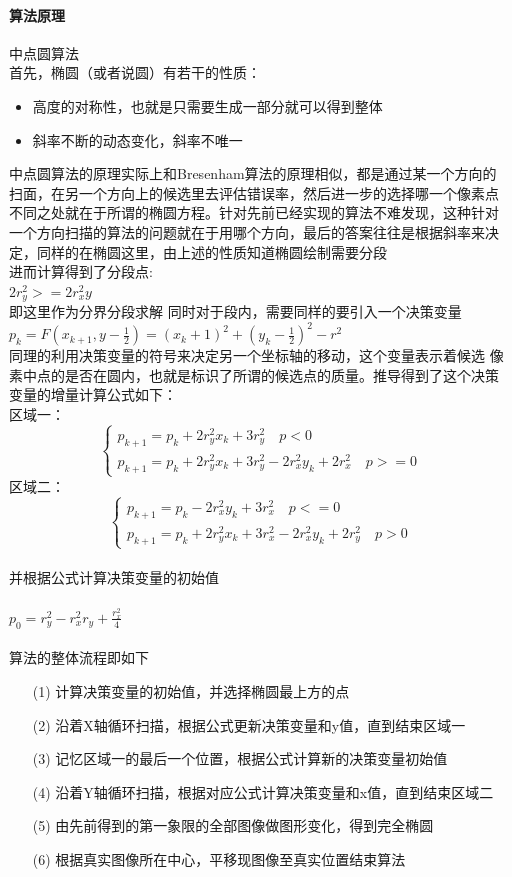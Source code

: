 \documentclass[a4paper,UTF8]{article}
\theoremstyle{definition}
\begin{document}
\paragraph{算法原理}
中点圆算法\\
首先，椭圆（或者说圆）有若干的性质：
\begin{itemize}
    \item 高度的对称性，也就是只需要生成一部分就可以得到整体
    \item 斜率不断的动态变化，斜率不唯一
\end{itemize}
中点圆算法的原理实际上和Bresenham算法的原理相似，都是通过某一个方向的
扫面，在另一个方向上的候选里去评估错误率，然后进一步的选择哪一个像素点
不同之处就在于所谓的椭圆方程。针对先前已经实现的算法不难发现，这种针对
一个方向扫描的算法的问题就在于用哪个方向，最后的答案往往是根据斜率来决
定，同样的在椭圆这里，由上述的性质知道椭圆绘制需要分段\\
进而计算得到了分段点:\\
\indent $2r_y^2>=2r_x^2y$\\
即这里作为分界分段求解
同时对于段内，需要同样的要引入一个决策变量\\
$p_k=F(x_{k+1},y-\frac{1}{2})=(x_k+1)^2+(y_k-\frac{1}{2})^2-r^2$\\
同理的利用决策变量的符号来决定另一个坐标轴的移动，这个变量表示着候选
像素中点的是否在圆内，也就是标识了所谓的候选点的质量。推导得到了这个决策
变量的增量计算公式如下：\\
区域一：
$$
\begin{cases}
    p_{k+1}=p_k +2r_y^2x_k+3r_y^2 \quad \text{$p<0$}\\
    p_{k+1}=p_k +2r_y^2x_k+3r_y^2-2r_x^2y_k+2r_x^2 \quad \text{$p>=0$}
\end{cases}
$$
区域二：
$$
\begin{cases}
    p_{k+1}=p_k -2r_x^2y_k+3r_x^2 \quad \text{$p<=0$}\\
    p_{k+1}=p_k +2r_y^2x_k+3r_x^2-2r_x^2y_k+2r_y^2 \quad \text{$p>0$}
\end{cases}
$$\\
并根据公式计算决策变量的初始值\\\\
$p_0=r_y^2-r_x^2r_y+\frac{r_x^2}{4}$\\\\
算法的整体流程即如下
\begin{itemize}
    \item [(1)] 
    计算决策变量的初始值，并选择椭圆最上方的点
    \item [(2)]
    沿着X轴循环扫描，根据公式更新决策变量和y值，直到结束区域一
    \item [(3)]
    记忆区域一的最后一个位置，根据公式计算新的决策变量初始值
    \item [(4)]
    沿着Y轴循环扫描，根据对应公式计算决策变量和x值，直到结束区域二
    \item [(5)]
    由先前得到的第一象限的全部图像做图形变化，得到完全椭圆
    \item [(6)]
    根据真实图像所在中心，平移现图像至真实位置结束算法
  \end{itemize}
\end{document}
